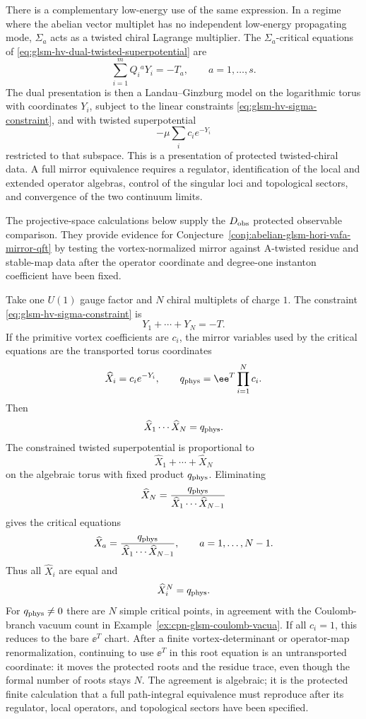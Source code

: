 There is a complementary low-energy use of the same expression.  In a
regime where the abelian vector multiplet has no independent low-energy
propagating mode, \(\Sigma_a\) acts as a twisted chiral Lagrange multiplier.
The \(\Sigma_a\)-critical equations of
\eqref{eq:glsm-hv-dual-twisted-superpotential} are
\begin{equation}
  \sum_{i=1}^m Q_i{}^aY_i=-T_a,
  \qquad a=1,\ldots,s .
  \label{eq:glsm-hv-sigma-constraint}
\end{equation}
The dual presentation is then a Landau--Ginzburg model on the logarithmic
torus with coordinates \(Y_i\), subject to the linear constraints
\eqref{eq:glsm-hv-sigma-constraint}, and with twisted superpotential
\[
  -\mu\sum_i c_i e^{-Y_i}
\]
restricted to that subspace.  This is a presentation of protected
twisted-chiral data.  A full mirror equivalence requires a regulator,
identification of the local and extended operator algebras, control of the
singular loci and topological sectors, and convergence of the two continuum
limits.

The projective-space calculations below supply the \(D_{\rm obs}\) protected
observable comparison.  They provide evidence for
Conjecture~\ref{conj:abelian-glsm-hori-vafa-mirror-qft} by testing the
vortex-normalized mirror against A-twisted residue and stable-map data after
the operator coordinate and degree-one instanton coefficient have been fixed.

\begin{example}
\label{ex:cpn-hv-dual-critical-points}
Take one \(U(1)\) gauge factor and \(N\) chiral multiplets of charge \(1\).
The constraint \eqref{eq:glsm-hv-sigma-constraint} is
\[
  Y_1+\cdots+Y_N=-T .
\]
If the primitive vortex coefficients are \(c_i\), the mirror variables used by
the critical equations are the transported torus coordinates
\[
  \widehat X_i=c_i e^{-Y_i},
  \qquad
  q_{\rm phys}=\ee^T\prod_{i=1}^Nc_i .
\]
Then
\[
  \widehat X_1\cdots\widehat X_N=q_{\rm phys}.
\]
The constrained twisted superpotential is proportional to
\[
  \widehat X_1+\cdots+\widehat X_N
\]
on the algebraic torus with fixed product \(q_{\rm phys}\).  Eliminating
\[
  \widehat X_N
  =
  \frac{q_{\rm phys}}{\widehat X_1\cdots\widehat X_{N-1}}
\]
gives the critical equations
\[
  \widehat X_a
  =
  \frac{q_{\rm phys}}{\widehat X_1\cdots\widehat X_{N-1}},
  \qquad a=1,\ldots,N-1.
\]
Thus all \(\widehat X_i\) are equal and
\[
  \widehat X_i^N=q_{\rm phys}.
\]
For \(q_{\rm phys}\neq0\) there are \(N\) simple critical points, in agreement
with the Coulomb-branch vacuum count in
Example~\ref{ex:cpn-glsm-coulomb-vacua}.  If all \(c_i=1\), this reduces to the
bare \(\ee^T\) chart.  After a finite vortex-determinant or operator-map
renormalization, continuing to use \(\ee^T\) in this root equation is an
untransported coordinate: it moves the protected roots and the residue trace,
even though the formal number of roots stays \(N\).  The agreement is
algebraic; it is the protected finite calculation that a full path-integral
equivalence must reproduce after its regulator, local operators, and
topological sectors have been specified.
\end{example}

